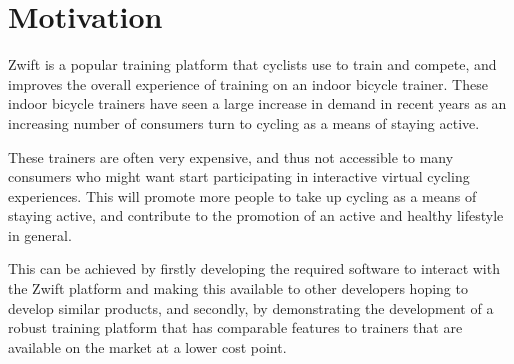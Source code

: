 %

\newpage

\section{Motivation}

Zwift is a popular training platform that cyclists use to train and compete, and improves the overall experience of training on an indoor bicycle trainer. These indoor bicycle trainers have seen a large increase in demand in recent years as an increasing number of consumers turn to cycling as a means of staying active.

These trainers are often very expensive, and thus not accessible to many consumers who might want start participating in interactive virtual cycling experiences. This will promote more people to take up cycling as a means of staying active, and contribute to the promotion of an active and healthy lifestyle in general.

This can be achieved by firstly developing the required software to interact with the Zwift platform and making this available to other developers hoping to develop similar products, and secondly, by demonstrating the development of a robust training platform that has comparable features to trainers that are available on the market at a lower cost point.
